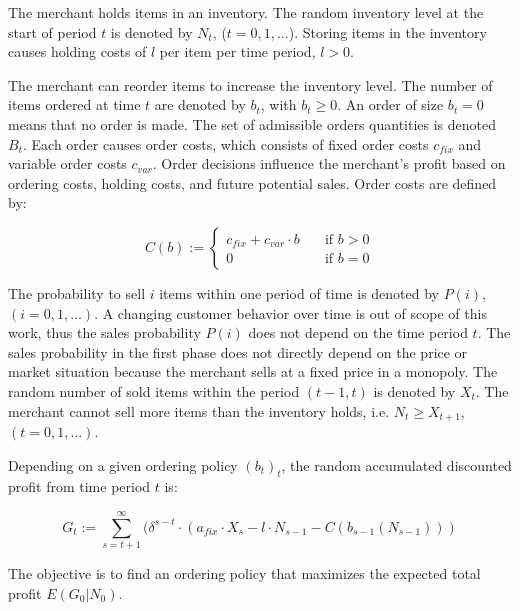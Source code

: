 The merchant holds items in an inventory.
The random inventory level at the start of period $t$ is denoted by $N_t$, ($t = 0, 1, \ldots$).
Storing items in the inventory causes holding costs of $l$ per item per time period, $l > 0$.

The merchant can reorder items to increase the inventory level.
The number of items ordered at time $t$ are denoted by $b_t$, with $b_t \geq 0$.
An order of size $b_t = 0$ means that no order is made.
The set of admissible orders quantities is denoted $B_t$.
Each order causes order costs, which consists of fixed order costs $c_{fix}$ and variable order costs $c_{var}$.
Order decisions influence the merchant's profit based on ordering costs, holding costs, and future potential sales.
Order costs are defined by:

\begin{equation}
\label{eq:order_cost}
C(b) := \begin{cases}
	c_{fix} + c_{var} \cdot b  & \quad \text{if } b > 0 \\
	0  & \quad \text{if } b = 0
\end{cases}
\end{equation}

The probability to sell $i$ items within one period of time is denoted by $P(i)$, $(i = 0, 1, \ldots)$.
A changing customer behavior over time is out of scope of this work, thus the sales probability $P(i)$ does not depend on the time period $t$.
The sales probability in the first phase does not directly depend on the price or market situation because the merchant sells at a fixed price in a monopoly.
The random number of sold items within the period $(t-1, t)$ is denoted by $X_t$.
The merchant cannot sell more items than the inventory holds, i.e. $N_t \geq X_{t+1}$, $(t = 0, 1, \ldots)$.

Depending on a given ordering policy $(b_t)_t$, the random accumulated discounted profit from time period $t$ is:

$$
G_t := \sum_{s=t+1}^{\infty} (\delta^{s-t} \cdot (a_{fix} \cdot X_s - l \cdot N_{s-1} - C(b_{s-1}(N_{s-1})))
$$

The objective is to find an ordering policy that maximizes the expected total profit $E(G_0 | N_0)$.


